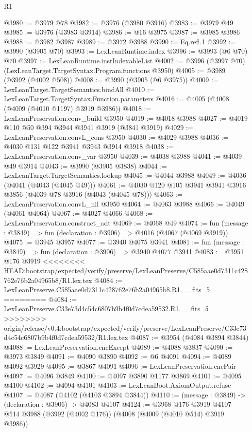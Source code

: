 \begin{lexlean}{R1}
\begin{coremodule}
{{{{{{{{{{{{{{{{{{{{{{{{{{{{{{{{{{{{{{{{{{{{{{{{{{{{{{{{{{{{{{{{{{{{{{{{{{{{{{{{{{{{{{{{{{{{{{{{{{{{{{{{{{{{{{{{{{{{{{{{{{{{{{{{{{{{{{{{{{{{{{{{{{{{{{{{{{{{{{{{{{{{{{{{{{{{{{{{{{{{{{{{{{@3980 := @3979 @78
@3982 := @3976 (@3980 @3916)
@3983 := @3979 @49
@3985 := @3976 (@3983 @3914)
@3986 := @16 @3975
@3987 := @3985 @3986
@3988 := @3982 @3987
@3989 := @3972 @3988
@3990 := Eq.refl.{1}
@3992 := @3990 (@3905 @70)
@3993 := LexLeanRuntime.index
@3996 := @3993 (@6 @70) @70
@3997 := LexLeanRuntime.instIndexableList
@4002 := @3996 (@3997 @70) (LexLeanTarget.TargetSyntax.Program.functions @3950)
@4005 := @3989 (@3992 (@4002 @508))
@4008 := @3990 (@3905 (@6 @3975))
@4009 := LexLeanTarget.TargetSemantics.bindAll
@4010 := LexLeanTarget.TargetSyntax.Function.parameters
@4016 := @4005 (@4008 (@4009 (@4010 @1197) @3919 @3986))
@4018 := LexLeanPreservation.conv_build @3950
@4019 := @4018 @3988
@4027 := @4019 @110 @50 @394 @3944 @3941 @3919 (@3841 @3919)
@4029 := LexLeanPreservation.convL_cons @3950
@4030 := @4029 @3988
@4036 := @4030 @131 @122 @3941 @3943 @3914 @3918
@4038 := LexLeanPreservation.conv_var @3950
@4039 := @4038 @3988
@4041 := @4039 @49 @3914
@4043 := @3990 (@3905 @3838)
@4044 := LexLeanTarget.TargetSemantics.lookup
@4045 := @4044 @3988
@4049 := @4036 (@4041 (@4043 (@4045 @49)))
@4061 := @4030 @120 @105 @3941 @3941 @3916 @3856 (@4039 @78 @3916 (@4043 (@4045 @78)))
@4063 := LexLeanPreservation.convL_nil @3950
@4064 := @4063 @3988
@4066 := @4049 (@4061 @4064)
@4067 := @4027 @4066
@4068 := LexLeanPreservation.construct_adt
@4069 := @4068 @49
@4074 := fun (message : @3849) => fun (declaration : @3906) => @4016 (@4067 (@4069 @3919))
@4075 := @3945 @3957
@4077 := @3940 @4075 @3941
@4081 := fun (message : @3849) => fun (declaration : @3906) => @3940 @4077 @3941
@4083 := @3951 @176 @3919
<<<<<<<< HEAD:bootstrap/expected/verify/preserve/LexLeanPreserve/C585aae0d7311c428762e76b2a04965b8/R1.lex.tex
@4084 := LexLeanPreserve.C585aae0d7311c428762e76b2a04965b8.R1.__fits_5
========
@4084 := LexLeanPreserve.C33e73d4c54c6807b9b4f0d7cdea59532.R1.__fits_5
>>>>>>>> origin/release/v0.4:bootstrap/expected/verify/preserve/LexLeanPreserve/C33e73d4c54c6807b9b4f0d7cdea59532/R1.lex.tex
@4087 := @3954 (@4084 @3894 @3844)
@4088 := LexLeanPreservation.encExcept
@4089 := @4088 @3837
@4090 := @3973 @3849
@4091 := @4090 @3890
@4092 := @6 @4091
@4094 := @4089 @4092 @3929
@4095 := @3867 @4091
@4096 := LexLeanPreservation.encPair
@4097 := @4096 @3849
@4100 := @4097 @3890 @1177 @3869
@4101 := @4095 @4100
@4102 := @4094 @4101
@4103 := LexLeanBoot.AxiomOutput.refuse
@4107 := @4087 (@4102 (@4103 @3894 @3844))
@4110 := (message : @3849) -> (declaration : @3906) -> @4083 @4107
@4124 := @3968
    @176
    @3919
    @4107
    @514
    @3988
    (@3992 (@4002 @176))
    (@4008 (@4009 (@4010 @514) @3919 @3986))
}}}}}}}}}}}}}}}}}}}}}}}}}}}}}}}}}}}}}}}}}}}}}}}}}}}}}}}}}}}}}}}}}}}}}}}}}}}}}}}}}}}}}}}}}}}}}}}}}}}}}}}}}}}}}}}}}}}}}}}}}}}}}}}}}}}}}}}}}}}}}}}}}}}}}}}}}}}}}}}}}}}}}}}}}}}}}}}}}}}}}}}}}}
\end{coremodule}
\end{lexlean}
